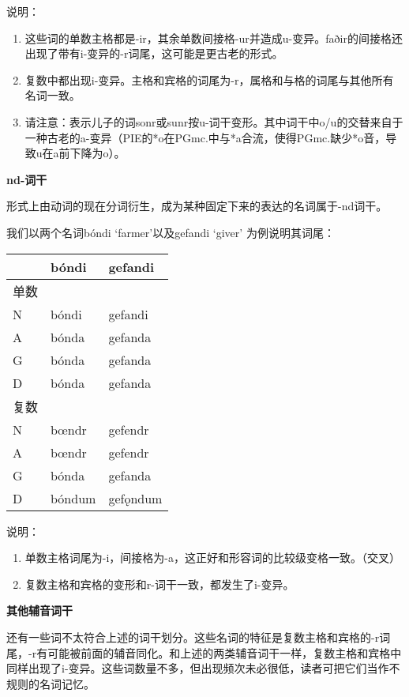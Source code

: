 说明：

\begin{enumerate}
  \def\labelenumi{\arabic{enumi})}
  \item
        这些词的单数主格都是-ir，其余单数间接格-ur并造成u-变异。faðir的间接格还出现了带有i-变异的-r词尾，这可能是更古老的形式。
  \item
        复数中都出现i-变异。主格和宾格的词尾为-r，属格和与格的词尾与其他所有名词一致。
  \item
        请注意：表示儿子的词sonr或sunr按u-词干变形。其中词干中o/u的交替来自于一种古老的a-变异（PIE的*o在PGmc.中与*a合流，使得PGmc.缺少*o音，导致u在a前下降为o）。
\end{enumerate}

\textbf{nd-词干}

形式上由动词的现在分词衍生，成为某种固定下来的表达的名词属于-nd词干。

我们以两个名词bóndi `farmer'以及gefandi `giver' 为例说明其词尾：

\begin{longtable}{lll}
  \toprule
     & bóndi  & gefandi  \\
  \midrule
  \endhead
  \bottomrule
  \endfoot
  单数 &        &          \\
  N  & bóndi  & gefandi  \\
  A  & bónda  & gefanda  \\
  G  & bónda  & gefanda  \\
  D  & bónda  & gefanda  \\
  复数 &        &          \\
  N  & bœndr  & gefendr  \\
  A  & bœndr  & gefendr  \\
  G  & bónda  & gefanda  \\
  D  & bóndum & gefǫndum \\
\end{longtable}

说明：

\begin{enumerate}
  \def\labelenumi{\arabic{enumi})}
  \item
        单数主格词尾为-i，间接格为-a，这正好和形容词的比较级变格一致。（交叉）
  \item
        复数主格和宾格的变形和r-词干一致，都发生了i-变异。
\end{enumerate}

\textbf{其他辅音词干}

还有一些词不太符合上述的词干划分。这些名词的特征是复数主格和宾格的-r词尾，-r有可能被前面的辅音同化。和上述的两类辅音词干一样，复数主格和宾格中同样出现了i-变异。这些词数量不多，但出现频次未必很低，读者可把它们当作不规则的名词记忆。

